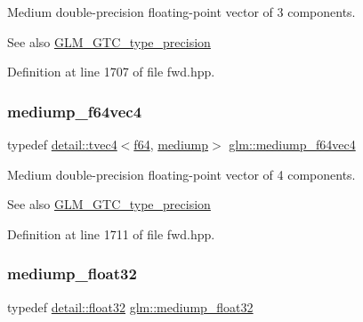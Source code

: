 Medium double-\/precision floating-\/point vector of 3 components. \begin{DoxySeeAlso}{See also}
\hyperlink{group__gtc__type__precision}{G\+L\+M\+\_\+\+G\+T\+C\+\_\+type\+\_\+precision} 
\end{DoxySeeAlso}


Definition at line 1707 of file fwd.\+hpp.

\mbox{\label{group__gtc__type__precision_ga0e011facac062fd7fb9b40c7d8288310}} 
\subsubsection{\texorpdfstring{mediump\+\_\+f64vec4}{mediump\_f64vec4}}
{\footnotesize\ttfamily typedef \hyperlink{structglm_1_1detail_1_1tvec4}{detail\+::tvec4}$<$\hyperlink{group__gtc__type__precision_ga2bba392e555124b36cde6abba349bab3}{f64}, \hyperlink{namespaceglm_a0f04f086094c747d227af4425893f545a6416f3ea0c9025fb21ed50c4d6620482}{mediump}$>$ \hyperlink{group__gtc__type__precision_ga0e011facac062fd7fb9b40c7d8288310}{glm\+::mediump\+\_\+f64vec4}}

Medium double-\/precision floating-\/point vector of 4 components. \begin{DoxySeeAlso}{See also}
\hyperlink{group__gtc__type__precision}{G\+L\+M\+\_\+\+G\+T\+C\+\_\+type\+\_\+precision} 
\end{DoxySeeAlso}


Definition at line 1711 of file fwd.\+hpp.

\mbox{\label{group__gtc__type__precision_ga1b5f74cbeed0c9d42cd57d77609be7ee}} 
\subsubsection{\texorpdfstring{mediump\+\_\+float32}{mediump\_float32}}
{\footnotesize\ttfamily typedef \hyperlink{namespaceglm_1_1detail_ad60558c5c304624de0b54c51b5857737}{detail\+::float32} \hyperlink{group__gtc__type__precision_ga1b5f74cbeed0c9d42cd57d77609be7ee}{glm\+::mediump\+\_\+float32}}


